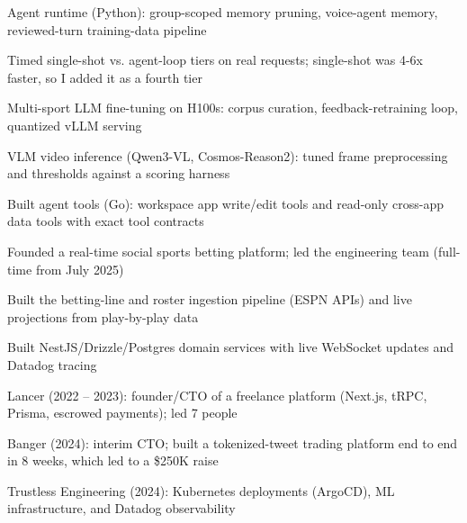 \documentclass[print]{jack-resume}
\begin{document}
\begin{tightemize}
    \item Agent runtime (Python): group-scoped memory pruning, voice-agent memory, reviewed-turn training-data pipeline
    \item Timed single-shot vs. agent-loop tiers on real requests; single-shot was 4-6x faster, so I added it as a fourth tier
    \item Multi-sport LLM fine-tuning on H100s: corpus curation, feedback-retraining loop, quantized vLLM serving
    \item VLM video inference (Qwen3-VL, Cosmos-Reason2): tuned frame preprocessing and thresholds against a scoring harness
    \item Built agent tools (Go): workspace app write/edit tools and read-only cross-app data tools with exact tool contracts
\end{tightemize}
\sectionsep

\begin{tightemize}
    \item Founded a real-time social sports betting platform; led the engineering team (full-time from July 2025)
    \item Built the betting-line and roster ingestion pipeline (ESPN APIs) and live projections from play-by-play data
    \item Built NestJS/Drizzle/Postgres domain services with live WebSocket updates and Datadog tracing
\end{tightemize}
\sectionsep

\begin{tightemize}
    \item Lancer (2022 -- 2023): founder/CTO of a freelance platform (Next.js, tRPC, Prisma, escrowed payments); led 7 people
    \item Banger (2024): interim CTO; built a tokenized-tweet trading platform end to end in 8 weeks, which led to a \$250K raise
    \item Trustless Engineering (2024): Kubernetes deployments (ArgoCD), ML infrastructure, and Datadog observability
\end{tightemize}
\sectionsep
\end{document}
